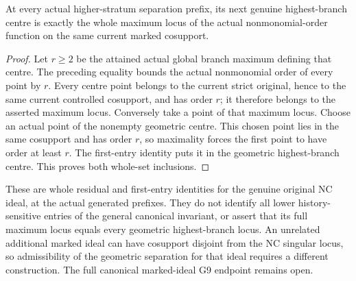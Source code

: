 \begin{corollary}
\label{hir:general-nc-actual-first-entry-maximum-centre}
\leanok
At every actual higher-stratum separation prefix, its next genuine
highest-branch centre is exactly the whole maximum locus of the actual
nonmonomial-order function on the same current marked cosupport.
\end{corollary}
\begin{proof}
Let $r\ge2$ be the attained actual global branch maximum defining that
centre. The preceding equality bounds the actual nonmonomial order of
every point by $r$. Every centre point belongs to the current strict
original, hence to the same current controlled cosupport, and has
order $r$; it therefore belongs to the asserted maximum locus.
Conversely take a point of that maximum locus. Choose an actual point
of the nonempty geometric centre. This chosen point lies in the same
cosupport and has order $r$, so maximality forces the first point to
have order at least $r$. The first-entry identity puts it in the
geometric highest-branch centre. This proves both whole-set inclusions.
\end{proof}

\begin{remark}
These are whole residual and first-entry identities for the genuine
original NC ideal, at the actual generated prefixes. They do not
identify all lower history-sensitive entries of the general canonical
invariant, or assert that its full maximum locus equals every geometric
highest-branch locus. An unrelated additional marked ideal can have
cosupport disjoint from the NC singular locus, so admissibility of the
geometric separation for that ideal requires a different construction.
The full canonical marked-ideal G9 endpoint remains open.
\end{remark}
